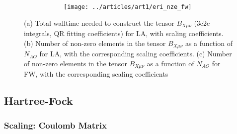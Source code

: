 \begin{figure}
\begin{subfigure}{\textwidth}
\begin{subfigure}{0.45\textwidth}
\centering
\texttt{[image: ../articles/art1/eri\_nze\_fw]}
\end{subfigure}
\hfill
\begin{subtable}{0.45\textwidth}
\centering
{}
\end{subtable}
\caption{}
\label{fig:GS_BNZE_FW}
\end{subfigure}
\caption{(a) Total walltime needed to construct the tensor $B_{X\mu\nu}$ (3c2e integrals, QR fitting coefficients) for LA, with scaling coefficients. (b) Number of non-zero elements in the tensor $B_{X\mu\nu}$ as a function of $N_{AO}$ for LA, with the corresponding scaling coefficients. (c) Number of non-zero elements in the tensor $B_{X\mu\nu}$ as a function of $N_{AO}$ for FW, with the corresponding scaling coefficients}
\end{figure}


%
%

\subsection{Hartree-Fock}

\subsubsection{Scaling: Coulomb Matrix}

